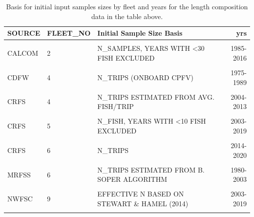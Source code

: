 \documentclass[11pt,
  english,
  a4paper,
]{article}
\begin{document}
\begin{table}

\caption{\label{tab:length-inputN}Basis for initial input samples sizes by fleet and years for the length composition data in the table above.}
\centering
\fontsize{10}{12}\selectfont
\begin{tabular}[t]{lllr}
\toprule
SOURCE & FLEET\_NO & Initial Sample Size Basis & yrs\\
\midrule
\cellcolor{gray!6}{CALCOM} & \cellcolor{gray!6}{1} & \cellcolor{gray!6}{N\_SAMPLES, YEARS WITH <30 FISH EXCLUDED} & \cellcolor{gray!6}{1983-2020}\\
CALCOM & 2 & N\_SAMPLES, YEARS WITH <30 FISH EXCLUDED & 1985-2016\\
\cellcolor{gray!6}{CALCOM} & \cellcolor{gray!6}{3} & \cellcolor{gray!6}{N\_SAMPLES, YEARS WITH <30 FISH EXCLUDED} & \cellcolor{gray!6}{1983-1998}\\
CDFW & 4 & N\_TRIPS (ONBOARD CPFV) & 1975-1989\\
\cellcolor{gray!6}{CRFS} & \cellcolor{gray!6}{4} & \cellcolor{gray!6}{N\_TRIPS} & \cellcolor{gray!6}{2014-2020}\\
CRFS & 4 & N\_TRIPS ESTIMATED FROM AVG. FISH/TRIP & 2004-2013\\
\cellcolor{gray!6}{MRFSS} & \cellcolor{gray!6}{4} & \cellcolor{gray!6}{N\_TRIPS ESTIMATED FROM B. SOPER ALGORITHM} & \cellcolor{gray!6}{1980-2003}\\
CRFS & 5 & N\_FISH, YEARS WITH <10 FISH EXCLUDED & 2003-2019\\
\cellcolor{gray!6}{CDFW} & \cellcolor{gray!6}{6} & \cellcolor{gray!6}{N\_FISH / 10} & \cellcolor{gray!6}{1978-1978}\\
CRFS & 6 & N\_TRIPS & 2014-2020\\
\cellcolor{gray!6}{CRFS} & \cellcolor{gray!6}{6} & \cellcolor{gray!6}{N\_TRIPS ESTIMATED FROM AVG. FISH/TRIP} & \cellcolor{gray!6}{2004-2013}\\
MRFSS & 6 & N\_TRIPS ESTIMATED FROM B. SOPER ALGORITHM & 1980-2003\\
\cellcolor{gray!6}{NWFSC} & \cellcolor{gray!6}{8} & \cellcolor{gray!6}{N\_SAMPLES (NUMBER OF POSITIVE DROPS)} & \cellcolor{gray!6}{2004-2019}\\
NWFSC & 9 & EFFECTIVE N  BASED ON STEWART \& HAMEL (2014) & 2003-2019\\
\cellcolor{gray!6}{CDFW} & \cellcolor{gray!6}{11} & \cellcolor{gray!6}{N\_FISH / 10} & \cellcolor{gray!6}{1975-1979}\\
\bottomrule
\end{tabular}
\end{table}
\end{document}
